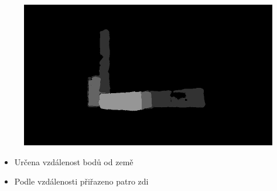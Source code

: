 \begin{frame}
    \begin{minipage}{0.60\textwidth}
        \begin{figure}
            \centering
            \includegraphics[width = \linewidth]{Prahovani_prezentace.jpg}
        \end{figure}
    \end{minipage}
    \begin{minipage}{0.39\textwidth}
        \begin{itemize}
            \item Určena vzdálenost bodů od země
            \item Podle vzdálenosti přiřazeno patro zdi
        \end{itemize}
    \end{minipage}
\end{frame}


